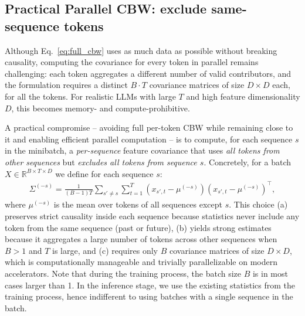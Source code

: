 \fi

\fi


\subsection{Practical Parallel CBW: exclude same-sequence tokens}


Although Eq.~\eqref{eq:full_cbw} uses as much data as possible without breaking causality, computing the covariance for every token in parallel remains challenging:
each token aggregates a different number of valid contributors, and the formulation requires a distinct $B \cdot T$ covariance matrices of size $D\times D$ each, for all the tokens.
For realistic LLMs with large $T$ and high feature dimensionality $D$, this becomes memory- and compute-prohibitive.

A practical compromise -- avoiding full per-token CBW while remaining close to it and enabling efficient parallel computation -- is to compute, for each sequence \(s\) in the minibatch, a \emph{per-sequence} feature covariance that uses \emph{all tokens from other sequences} but \emph{excludes all tokens from sequence \(s\)}. Concretely, for a batch \(X\in\mathbb{R}^{B\times T\times D}\) we define for each sequence \(s\):
\begin{align*}
\Sigma^{(-s)} = \frac{1}{(B-1)T}
\sum_{s'\neq s}\sum_{t=1}^{T}
(x_{s',t}-\mu^{(-s)})(x_{s',t}-\mu^{(-s)})^{\top},
\end{align*}
where \(\mu^{(-s)}\) is the mean over tokens of all sequences except \(s\).
This choice (a) preserves strict causality inside each sequence because statistics never include any token from the same sequence (past or future), (b) yields strong estimates because it aggregates a large number of tokens across other sequences when \(B>1\) and \(T\) is large, and (c) requires only \(B\) covariance matrices of size \(D\times D\), which is computationally manageable and trivially parallelizable on modern accelerators.
Note that during the training process, the batch size $B$ is in most cases larger than 1.
In the inference stage, we use the existing statistics from the training process, hence indifferent to using batches with a single sequence in the batch.


